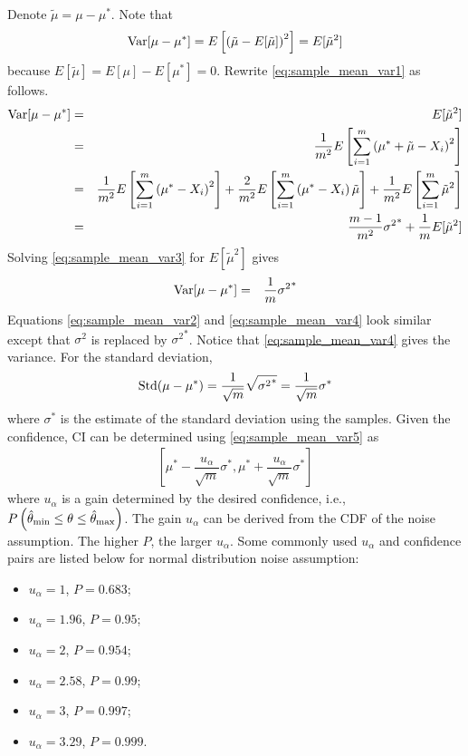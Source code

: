 Denote $\tilde{\mu} = \mu-\mu^*$. Note that 
\begin{eqnarray}
	\textup{Var}[\mu-\mu^*] = E\left[\left(\tilde{\mu}-E[\tilde{\mu}]\right)^2\right] = E[\tilde{\mu}^2] \nonumber
\end{eqnarray}
because $E[\tilde{\mu}]=E[\mu]-E[\mu^*]=0$. Rewrite \eqref{eq:sample_mean_var1} as follows.
\begin{eqnarray}
	\textup{Var}[\mu-\mu^*] &=& E[\tilde{\mu}^2] \nonumber \\
	 &=& \dfrac{1}{m^2}E\left[\sum_{i=1}^{m}\left(\mu^*+\tilde{\mu}-X_i\right)^2\right] \nonumber \\
	&=& \dfrac{1}{m^2}E\left[\sum_{i=1}^{m}\left(\mu^*-X_i\right)^2\right] + \dfrac{2}{m^2}E\left[\sum_{i=1}^{m}\left(\mu^*-X_i\right)\tilde{\mu}\right] + \dfrac{1}{m^2}E\left[\sum_{i=1}^{m}\tilde{\mu}^2\right] \nonumber \\
	&=& \dfrac{m-1}{m^2}{\sigma^2}^* + \dfrac{1}{m}E[\tilde{\mu}^2] \label{eq:sample_mean_var3}
\end{eqnarray}
Solving \eqref{eq:sample_mean_var3} for $E[\tilde{\mu}^2]$ gives
\begin{eqnarray}
	\textup{Var}[\mu-\mu^*] &=& \dfrac{1}{m}{\sigma^2}^* \label{eq:sample_mean_var4}
\end{eqnarray}
Equations \eqref{eq:sample_mean_var2} and \eqref{eq:sample_mean_var4} look similar except that $\sigma^2$ is replaced by ${\sigma^2}^*$. Notice that \eqref{eq:sample_mean_var4} gives the variance. For the standard deviation,
\begin{eqnarray}
	\textup{Std}(\mu-\mu^*) = \dfrac{1}{\sqrt{m}}\sqrt{{\sigma^2}^*} = \dfrac{1}{\sqrt{m}}\sigma^* \label{eq:sample_mean_var5}
\end{eqnarray} 
where $\sigma^*$ is the estimate of the standard deviation using the samples. Given the confidence, CI can be determined using \eqref{eq:sample_mean_var5} as
\begin{eqnarray}
	\left[\mu^*-\dfrac{u_{\alpha}}{\sqrt{m}}\sigma^*, \mu^*+\dfrac{u_{\alpha}}{\sqrt{m}}\sigma^*\right] \label{eq:intervalci}
\end{eqnarray}
where $u_{\alpha}$ is a gain determined by the desired confidence, i.e., $P\left(\hat{\theta}_{\textup{min}} \leq \theta \leq \hat{\theta}_{\textup{max}}\right)$. The gain $u_{\alpha}$ can be derived from the CDF of the noise assumption. The higher $P$, the larger $u_{\alpha}$. Some commonly used $u_{\alpha}$ and confidence pairs are listed below for normal distribution noise assumption:
\begin{itemize}
	\item $u_{\alpha}=1$, $P=0.683$;
	\item $u_{\alpha}=1.96$, $P=0.95$;
	\item $u_{\alpha}=2$, $P=0.954$;
	\item $u_{\alpha}=2.58$, $P=0.99$;
	\item $u_{\alpha}=3$, $P=0.997$;
	\item $u_{\alpha}=3.29$, $P=0.999$.
\end{itemize}

